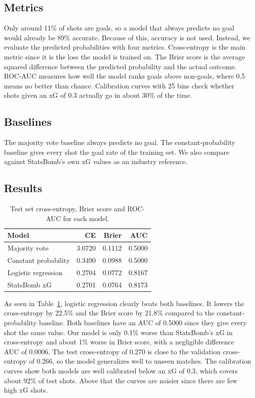 \documentclass[11pt]{article}
\begin{document}
  \subsection{Metrics}

  Only around 11\% of shots are goals, so a model that always predicts no goal would already be 89\% accurate. Because of this, accuracy is not used. Instead, we
  evaluate the predicted probabilities with four metrics. Cross-entropy is the main metric since it is the loss the model is trained on. The Brier score is the
  average squared difference between the predicted probability and the actual outcome. ROC-AUC measures how well the model ranks goals above non-goals, where 0.5
  means no better than chance. Calibration curves with 25 bins check whether shots given an xG of 0.3 actually go in about 30\% of the time.

  \subsection{Baselines}

  The majority vote baseline always predicts no goal. The constant-probability baseline gives every shot the goal rate of the training set. We also compare against
  StatsBomb's own xG values as an industry reference.

  \subsection{Results}

  \begin{table}[h]
    \centering
    \small
    \begin{tabular}{lrrr}
      \hline
      \textbf{Model} & \textbf{CE} & \textbf{Brier} & \textbf{AUC} \\
      \hline
      Majority vote        & 3.0720 & 0.1112 & 0.5000 \\
      Constant probability & 0.3490 & 0.0988 & 0.5000 \\
      Logistic regression  & 0.2704 & 0.0772 & 0.8167 \\
      StatsBomb xG         & 0.2701 & 0.0764 & 0.8173 \\
      \hline
    \end{tabular}
    \caption{\label{tab:test-results}
      Test set cross-entropy, Brier score and ROC-AUC for each model.}
  \end{table}

  As seen in Table~\ref{tab:test-results}, logistic regression clearly beats both baselines. It lowers the cross-entropy by 22.5\% and the Brier score by 21.8\%
  compared to the constant-probability baseline. Both baselines have an AUC of 0.5000 since they give every shot the same value. Our model is only 0.1\% worse than
  StatsBomb's xG in cross-entropy and about 1\% worse in Brier score, with a negligible difference AUC of 0.0006. The test cross-entropy of 0.270 is close to the validation
  cross-entropy of 0.266, so the model generalizes well to unseen matches. The calibration curves show both models are well calibrated below an xG of 0.3, which
  covers about 92\% of test shots. Above that the curves are noisier since there are few high xG shots.
\end{document}
